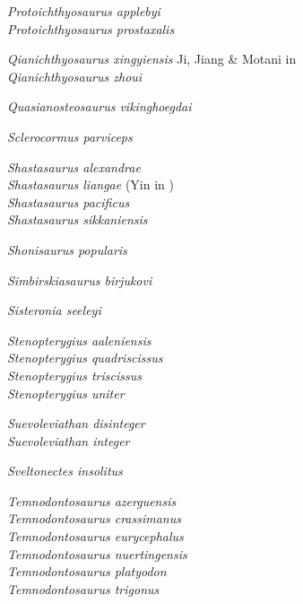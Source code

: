 \documentclass[british,11pt]{article}
\begin{document}
\emph{Protoichthyosaurus applebyi} \cite[Lomax et al.,][]{Lomax2017a}\\
\emph{Protoichthyosaurus prostaxalis} \cite[Appleby,][]{Appleby1979}

\emph{Qianichthyosaurus xingyiensis} Ji, Jiang \& Motani in \cite*[Yang et al.,][]{Yang2013}\\
\emph{Qianichthyosaurus zhoui} \cite*[Li,][]{Li1999}

\emph{Quasianosteosaurus vikinghoegdai} \cite*[Maisch \& Matzke,][]{Maisch2003c}

\emph{Sclerocormus parviceps} \cite*[Jiang et al.,][]{Jiang2016}

\emph{Shastasaurus alexandrae} \cite*[Merriam,][]{Merriam1902}\\
\emph{Shastasaurus liangae} (Yin in \cite*[Yin et al.,][]{Yin2000})\\
\emph{Shastasaurus pacificus} \cite*[Merriam,][]{Merriam1895}\\
\emph{Shastasaurus sikkaniensis} \parencite*[Nicholls \& Manabe,][]{Nicholls2004}

\emph{Shonisaurus popularis} \cite*[Camp,][]{Camp1976}

\emph{Simbirskiasaurus birjukovi} \cite*[Otschev \& Efimov,][]{Otschev1985}

\emph{Sisteronia seeleyi} \cite*[Fischer et al.,][]{Fischer2014a}

\emph{Stenopterygius aaleniensis} \cite*[Maxwell et al.,][]{Maxwell2012b}\\
\emph{Stenopterygius quadriscissus} \parencite*[Quenstedt,][]{Quenstedt1858}\\
\emph{Stenopterygius triscissus} \parencite*[Quenstedt,][]{Quenstedt1858}\\
\emph{Stenopterygius uniter} \cite*[Huene,][]{Huene1931b}

\emph{Suevoleviathan disinteger} \parencite*[Huene,][]{Huene1926}\\
\emph{Suevoleviathan integer} \parencite*[Bronn,][]{Bronn1844a}

\emph{Sveltonectes insolitus} \cite*[Fischer et al.,][]{Fischer2011c}

\emph{Temnodontosaurus azerguensis} \cite*[Martin et al.,][]{Martin2012}\\
\emph{Temnodontosaurus crassimanus} \parencite*[Blake,][]{Blake1876}\\
\emph{Temnodontosaurus eurycephalus} \cite*[McGowan,][]{McGowan1974}\\
\emph{Temnodontosaurus nuertingensis} \parencite*[Huene,][]{Huene1931}\\
\emph{Temnodontosaurus platyodon} \parencite*[Conybeare,][]{Conybeare1822}\\
\emph{Temnodontosaurus trigonus} \parencite*[Theodori,][]{Theodori1843}
\end{document}
